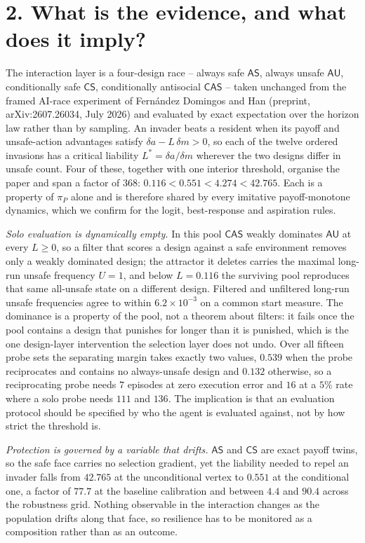 \documentclass[10pt,a4paper]{article}
\newcommand{\AS}{\textsf{AS}}
\newcommand{\AU}{\textsf{AU}}
\newcommand{\CS}{\textsf{CS}}
\newcommand{\CAS}{\textsf{CAS}}
\begin{document}
\section*{2. What is the evidence, and what does it imply?}

The interaction layer is a four-design race -- always safe $\AS$, always unsafe
$\AU$, conditionally safe $\CS$, conditionally antisocial $\CAS$ -- taken
unchanged from the framed AI-race experiment of Fern\'{a}ndez Domingos and Han
(preprint, arXiv:2607.26034, July 2026) and evaluated by exact expectation over
the horizon law rather than by sampling. An invader beats a resident when its
payoff and unsafe-action advantages satisfy $\delta a-L\,\delta m>0$, so each
of the twelve ordered invasions has a critical liability
$L^{*}=\delta a/\delta m$ wherever the two designs differ in unsafe count.
Four of these, together with one interior threshold, organise the paper and
span a factor of $368$: $0.116<0.551<4.274<42.765$. Each is a property of
$\pi_{P}$ alone and is therefore shared by every imitative payoff-monotone
dynamics, which we confirm for the logit, best-response and aspiration rules.

\emph{Solo evaluation is dynamically empty.} In this pool $\CAS$ weakly
dominates $\AU$ at every $L\ge0$, so a filter that scores a design against a
safe environment removes only a weakly dominated design; the attractor it
deletes carries the maximal long-run unsafe frequency $U=1$, and below
$L=0.116$ the surviving pool reproduces that same all-unsafe state on a
different design. Filtered and unfiltered long-run unsafe frequencies agree to
within $6.2\times10^{-3}$ on a common start measure. The dominance is a
property of the pool, not a theorem about filters: it fails once the pool
contains a design that punishes for longer than it is punished, which is the
one design-layer intervention the selection layer does not undo. Over all
fifteen probe sets the separating margin takes exactly two values, $0.539$ when
the probe reciprocates and contains no always-unsafe design and $0.132$
otherwise, so a reciprocating probe needs $7$ episodes at zero execution error
and $16$ at a $5\%$ rate where a solo probe needs $111$ and $136$. The
implication is that an evaluation protocol should be specified by who the agent
is evaluated against, not by how strict the threshold is.

\emph{Protection is governed by a variable that drifts.} $\AS$ and $\CS$ are
exact payoff twins, so the safe face carries no selection gradient, yet the
liability needed to repel an invader falls from $42.765$ at the unconditional
vertex to $0.551$ at the conditional one, a factor of $77.7$ at the baseline
calibration and between $4.4$ and $90.4$ across the robustness grid. Nothing
observable in the interaction changes as the population drifts along that face,
so resilience has to be monitored as a composition rather than as an outcome.
\end{document}

